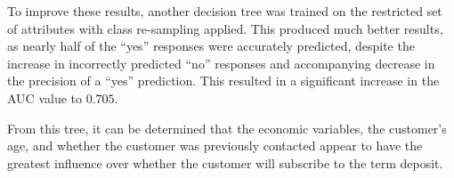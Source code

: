 \documentclass[prodmode]{acmsmall} %
\begin{document}
\begin{table}[!t]
\end{table}

To improve these results, another decision tree was trained on the
restricted set of attributes with class re-sampling applied. This produced much
better results, as nearly half of the ``yes'' responses were accurately predicted,
despite the increase in incorrectly predicted ``no'' responses and accompanying
decrease in the precision of a ``yes'' prediction.  This resulted in a
significant increase in the AUC value to $0.705$.

\begin{table}[!t]
\end{table}

From this tree, it can be determined that the economic variables, the customer's
age, and whether the customer was previously contacted appear to have the
greatest influence over whether the customer will subscribe to the term deposit.

\begin{figure}[!t]
\end{figure}
\end{document}
